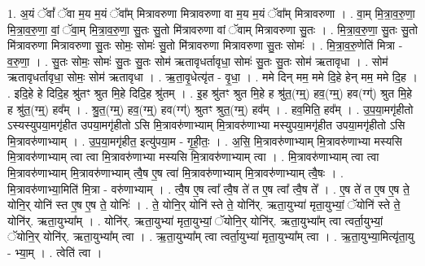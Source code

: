 \documentclass[17pt]{extarticle}
\begin{document}
1. अ॒यं ॅवां᳚ ॅवा म॒य म॒यं ॅवा᳚म् मित्रावरुणा मित्रावरुणा वा म॒य म॒यं ॅवा᳚म् मित्रावरुणा । . वा॒म् मि॒त्रा॒व॒रु॒णा॒ मि॒त्रा॒व॒रु॒णा॒ वां॒ ॅवा॒म् मि॒त्रा॒व॒रु॒णा॒ सु॒तः सु॒तो मि॑त्रावरुणा वां ॅवाम् मित्रावरुणा सु॒तः । . मि॒त्रा॒व॒रु॒णा॒ सु॒तः सु॒तो मि॑त्रावरुणा मित्रावरुणा सु॒तः सोमः॒ सोमः॑ सु॒तो मि॑त्रावरुणा मित्रावरुणा सु॒तः सोमः॑ । . मि॒त्रा॒व॒रु॒णेति॑ मित्रा - व॒रु॒णा॒ । . सु॒तः सोमः॒ सोमः॑ सु॒तः सु॒तः सोम॑ ऋतावृधर्तावृधा॒ सोमः॑ सु॒तः सु॒तः सोम॑ ऋतावृधा । . सोम॑ ऋतावृधर्तावृधा॒ सोमः॒ सोम॑ ऋतावृधा । . ऋ॒ता॒वृ॒धेत्यृ॑त - वृ॒धा॒ । . ममे दिन् मम॒ ममे दि॒हे हेन् मम॒ ममे दि॒ह । . इदि॒हे हे दिदि॒ह श्रु॑तꣳ श्रुत मि॒हे दिदि॒ह श्रु॑तम् । . इ॒ह श्रु॑तꣳ श्रुत मि॒हे ह श्रु॑त॒(ग्म्॒) हव॒(ग्म्॒) हव(ग्ग्॑) श्रुत मि॒हे ह श्रु॑त॒(ग्म्॒) हव᳚म् । . श्रु॒त॒(ग्म्॒) हव॒(ग्म्॒) हव(ग्ग्॑) श्रुतꣳ श्रुत॒(ग्म्॒) हव᳚म् । . हव॒मिति॒ हव᳚म् । . उ॒प॒या॒मगृ॑हीतो ऽस्यस्युपया॒मगृ॑हीत उपया॒मगृ॑हीतो ऽसि मि॒त्रावरु॑णाभ्याम् मि॒त्रावरु॑णाभ्या मस्युपया॒मगृ॑हीत उपया॒मगृ॑हीतो ऽसि मि॒त्रावरु॑णाभ्याम् । . उ॒प॒या॒मगृ॑हीत॒ इत्यु॑पया॒म - गृ॒ही॒तः॒ । . अ॒सि॒ मि॒त्रावरु॑णाभ्याम् मि॒त्रावरु॑णाभ्या मस्यसि मि॒त्रावरु॑णाभ्याम् त्वा त्वा मि॒त्रावरु॑णाभ्या मस्यसि मि॒त्रावरु॑णाभ्याम् त्वा । . मि॒त्रावरु॑णाभ्याम् त्वा त्वा मि॒त्रावरु॑णाभ्याम् मि॒त्रावरु॑णाभ्याम् त्वै॒ष ए॒ष त्वा॑ मि॒त्रावरु॑णाभ्याम् मि॒त्रावरु॑णाभ्याम् त्वै॒षः । . मि॒त्रावरु॑णाभ्या॒मिति॑ मि॒त्रा - वरु॑णाभ्याम् । . त्वै॒ष ए॒ष त्वा᳚ त्वै॒ष ते॑ त ए॒ष त्वा᳚ त्वै॒ष ते᳚ । . ए॒ष ते॑ त ए॒ष ए॒ष ते॒ योनि॒र् योनि॑ स्त ए॒ष ए॒ष ते॒ योनिः॑ । . ते॒ योनि॒र् योनि॑ स्ते ते॒ योनि॑र्. ऋता॒युभ्या॑ मृता॒युभ्यां॒ ॅयोनि॑ स्ते ते॒ योनि॑र्. ऋता॒युभ्या᳚म् । . योनि॑र्. ऋता॒युभ्या॑ मृता॒युभ्यां॒ ॅयोनि॒र् योनि॑र्. ऋता॒युभ्या᳚म् त्वा त्वर्ता॒युभ्यां॒ ॅयोनि॒र् योनि॑र्. ऋता॒युभ्या᳚म् त्वा । . ऋ॒ता॒युभ्या᳚म् त्वा त्वर्ता॒युभ्या॑ मृता॒युभ्या᳚म् त्वा । . ऋ॒ता॒युभ्या॒मित्यृ॑ता॒यु - भ्या॒म् । . त्वेति॑ त्वा । \newline
\pagebreak
{}
\end{document}
